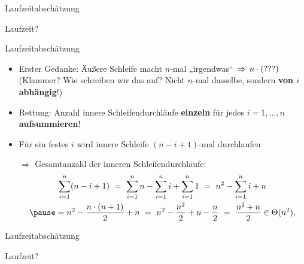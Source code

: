 \begin{frame}{Laufzeitabschätzung}
	\begin{exampleblock}{Laufzeit?}
		\begin{algorithm}[H]
		\end{algorithm}
	\end{exampleblock}
\end{frame}

\begin{frame}{Laufzeitabschätzung}
	\begin{itemize}
		\item Erster Gedanke: Äußere Schleife macht $n$-mal „irgendwas“ $\impl n \cdot (???)$ \\
		(Klammer? Wie schreiben wir das auf? Nicht $n$-mal dasselbe, sondern \textbf{von $i$ abhängig}!) 
		\pause
		\item Rettung: Anzahl innere Schleifendurchläufe \textbf{einzeln} für jedes $i = 1,\dots,n$ \textbf{aufsummieren}!
		\pause
		\item Für ein festes $i$ wird innere Schleife $(n-i+1)$-mal durchlaufen
		\pause
		\item[$\Rightarrow$] Gesamtanzahl der inneren Schleifendurchläufe:
		\begin{gather*}
			\sum\limits_{i=1}^n (n-i+1)\ =\ 
			\sum\limits_{i=1}^n n - \sum\limits_{i=1}^n i + \sum\limits_{i=1}^n 1\ =\ 
			n^2 - \sum\limits_{i=1}^n i + n      \\ \pause
			= n^2 - \frac{n \cdot (n+1)}{2} + n\ =\ 
			n^2 - \frac{n^2}{2} + n - \frac{n}{2}\ =\ 
			\frac{n^2 + n}{2} \in \Theta(n^2).
		\end{gather*}
	\end{itemize}
\end{frame}


\begin{frame}{Laufzeitabschätzung}
	\begin{exampleblock}{Laufzeit?}
		\begin{algorithm}[H]
		\end{algorithm}
	\end{exampleblock}
\end{frame}

